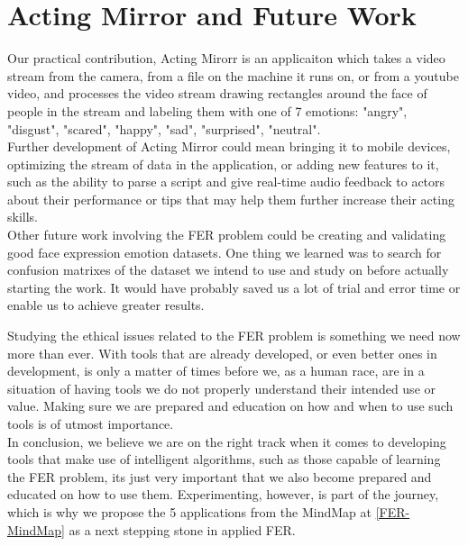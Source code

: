 \documentclass[runningheads,a4paper,11pt]{report}
\begin{document}
\clearpage
\section{Acting Mirror and Future Work}
\label{section:acting_mirror_and_future_work}

Our practical contribution, Acting Mirorr is an applicaiton which takes a video stream from the camera, from a file on the machine it runs on, or from a youtube video, and processes the video stream drawing rectangles around the face of people in the stream and labeling them with one of 7 emotions: "angry", "disgust", "scared", "happy", "sad", "surprised", "neutral".\\
Further development of Acting Mirror could mean bringing it to mobile devices, optimizing the stream of data in the application, or adding new features to it, such as the ability to parse a script and give real-time audio feedback to actors about their performance or tips that may help them further increase their acting skills.\\

Other future work involving the FER problem could be creating and validating good face expression emotion datasets. One thing we learned was to search for confusion matrixes of the dataset we intend to use and study on before actually starting the work. It would have probably saved us a lot of trial and error time or enable us to achieve greater results.

Studying the ethical issues related to the FER problem is something we need now more than ever. With tools that are already developed, or even better ones in development, is only a matter of times before we, as a human race, are in a situation of having tools we do not properly understand their intended use or value. Making sure we are prepared and education on how and when to use such tools is of utmost importance.\\

In conclusion, we believe we are on the right track when it comes to developing tools that make use of intelligent algorithms, such as those capable of learning the FER problem, its just very important that we also become prepared and educated on how to use them. Experimenting, however, is part of the journey, which is why we propose the 5 applications from the MindMap at \ref{FER-MindMap} as a next stepping stone in applied FER.




\end{document}
